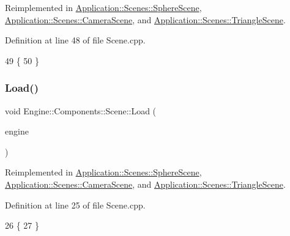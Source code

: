 Reimplemented in \mbox{\hyperlink{classApplication_1_1Scenes_1_1SphereScene_ad754dea94c77524a79d707436a933c66}{Application\+::\+Scenes\+::\+Sphere\+Scene}}, \mbox{\hyperlink{classApplication_1_1Scenes_1_1CameraScene_a92eb1a3eab4de7d18ca108e4aefd7fc7}{Application\+::\+Scenes\+::\+Camera\+Scene}}, and \mbox{\hyperlink{classApplication_1_1Scenes_1_1TriangleScene_a5622996232a2ad52735251c8398b0c9a}{Application\+::\+Scenes\+::\+Triangle\+Scene}}.



Definition at line 48 of file Scene.\+cpp.


\begin{DoxyCode}
49 \{
50 \}
\end{DoxyCode}
\mbox{\label{classEngine_1_1Components_1_1Scene_a23c5b23e66646443670a487e7c016e73}} 
\subsubsection{\texorpdfstring{Load()}{Load()}}
{\footnotesize\ttfamily void Engine\+::\+Components\+::\+Scene\+::\+Load (\begin{DoxyParamCaption}\item[{\mbox{\hyperlink{classEngine_1_1BaseEngine}{Base\+Engine}} $\ast$}]{engine }\end{DoxyParamCaption})\hspace{0.3cm}{\ttfamily [virtual]}}



Reimplemented in \mbox{\hyperlink{classApplication_1_1Scenes_1_1SphereScene_adf6f95bf2ac8f0e84935d04248407ba4}{Application\+::\+Scenes\+::\+Sphere\+Scene}}, \mbox{\hyperlink{classApplication_1_1Scenes_1_1CameraScene_a86f30a60a125f491176ecfca46cd6b8a}{Application\+::\+Scenes\+::\+Camera\+Scene}}, and \mbox{\hyperlink{classApplication_1_1Scenes_1_1TriangleScene_a4bfd44cab6aa0eafe47f379dafe3843e}{Application\+::\+Scenes\+::\+Triangle\+Scene}}.



Definition at line 25 of file Scene.\+cpp.


\begin{DoxyCode}
26 \{
27 \}
\end{DoxyCode}
\mbox{\label{classEngine_1_1Components_1_1Scene_a936218df56c481f3aa12d684cee038f3}} 
